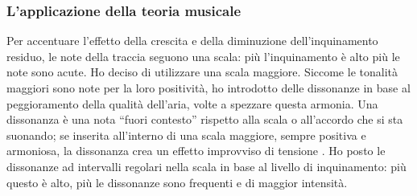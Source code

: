 \subsubsection{L'applicazione della teoria musicale}
Per accentuare l'effetto della crescita e della diminuzione dell'inquinamento residuo, le note della traccia seguono una scala: più l'inquinamento è alto più le note sono acute.
Ho deciso di utilizzare una scala maggiore. Siccome le tonalità maggiori sono note per la loro positività, ho introdotto delle dissonanze in base al peggioramento della qualità dell'aria, volte a spezzare questa armonia.
Una dissonanza è una nota “fuori contesto” rispetto alla scala o all'accordo che si sta suonando; se inserita all'interno di una scala maggiore, sempre positiva e armoniosa, la dissonanza crea un effetto improvviso di tensione \cite{dissonance}.
Ho posto le dissonanze ad intervalli regolari nella scala in base al livello di inquinamento: più questo è alto, più le dissonanze sono frequenti e di maggior intensità.